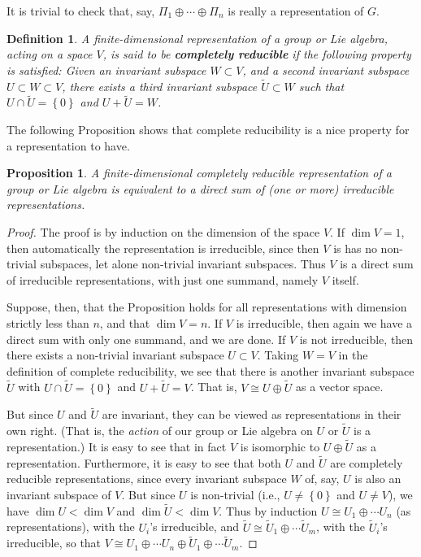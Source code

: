 \documentclass{amsbook}
\theoremstyle{plain}
\newtheorem{definition}[theorem]{Definition}
\newtheorem{proposition}[theorem]{Proposition}
\numberwithin{equation}{chapter}
\numberwithin{theorem}{chapter}
\begin{document}
It is trivial to check that, say, $\Pi_{1}\oplus\cdots\oplus\Pi_{n}$ is really
a representation of $G$.

\begin{definition}
A finite-dimensional representation of a group or Lie algebra, acting on a
space $V$, is said to be \textbf{completely reducible} if the following
property is satisfied: Given an invariant subspace $W\subset V$, and a second
invariant subspace $U\subset W\subset V$, there exists a third invariant
subspace $\widetilde{U}\subset W$ such that $U\cap\widetilde{U}=\left\{
0\right\}  $ and $U+\widetilde{U}=W$.
\end{definition}

The following Proposition shows that complete reducibility is a nice property
for a representation to have.

\begin{proposition}
A finite-dimensional completely reducible representation of a group or Lie
algebra is equivalent to a direct sum of (one or more) irreducible representations.
\end{proposition}

\begin{proof}
The proof is by induction on the dimension of the space $V$. If $\dim V=1$,
then automatically the representation is irreducible, since then $V$ is has no
non-trivial subspaces, let alone non-trivial invariant subspaces. Thus $V$ is
a direct sum of irreducible representations, with just one summand, namely $V$ itself.

Suppose, then, that the Proposition holds for all representations with
dimension strictly less than $n$, and that $\dim V=n$. If $V$ is irreducible,
then again we have a direct sum with only one summand, and we are done. If $V$
is not irreducible, then there exists a non-trivial invariant subspace
$U\subset V$. Taking $W=V$ in the definition of complete reducibility, we see
that there is another invariant subspace $\widetilde{U}$ with $U\cap
\widetilde{U}=\left\{  0\right\}  $ and $U+\widetilde{U}=V$. That is, $V\cong
U\oplus\widetilde{U}$ as a vector space.

But since $U$ and $\widetilde{U}$ are invariant, they can be viewed as
representations in their own right. (That is, the \textit{action} of our group
or Lie algebra on $U$ or $\widetilde{U}$ is a representation.) It is easy to
see that in fact $V$ is isomorphic to $U\oplus\widetilde{U}$ as a
representation. Furthermore, it is easy to see that both $U$ and
$\widetilde{U}$ are completely reducible representations, since every
invariant subspace $W$ of, say, $U$ is also an invariant subspace of $V$. But
since $U$ is non-trivial (i.e., $U\neq\left\{  0\right\}  $ and $U\neq V$), we
have $\dim U<\dim V$ and $\dim\widetilde{U}<\dim V$. Thus by induction $U\cong
U_{1}\oplus\cdots U_{n}$ (as representations), with the $U_{i}$'s irreducible,
and $\widetilde{U}\cong\widetilde{U}_{1}\oplus\cdots\widetilde{U}_{m}$, with
the $\widetilde{U}_{i}$'s irreducible, so that $V\cong U_{1}\oplus\cdots
U_{n}\oplus\widetilde{U}_{1}\oplus\cdots\widetilde{U}_{m}$.
\end{proof}
\end{document}

